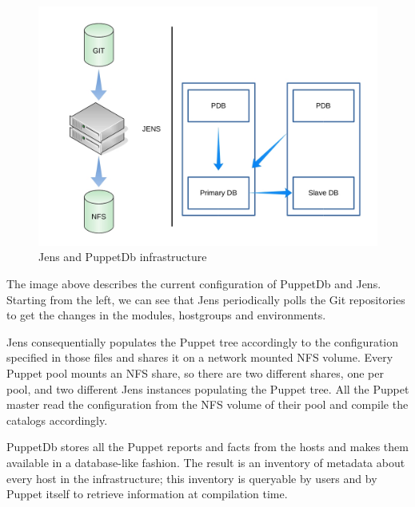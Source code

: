 \begin{figure}[H]
\includegraphics[width=\textwidth,height=\textheight,keepaspectratio]{ConfigurationManagement/Infrastructure_jens_pdb.jpg}
\caption{Jens and PuppetDb infrastructure}
\end{figure}

The image above describes the current configuration of PuppetDb and Jens.
Starting from the left, we can see that Jens periodically polls the Git
repositories to get the changes in the modules, hostgroups and
environments.

Jens consequentially populates the Puppet tree accordingly to the
configuration specified in those files and shares it on a network mounted
NFS volume. Every Puppet pool mounts an NFS share, so there are two
different shares, one per pool, and two different Jens instances
populating the Puppet tree. All the Puppet master read the configuration
from the NFS volume of their pool and compile the catalogs accordingly.

PuppetDb stores all the Puppet reports and facts from the hosts and makes
them available in a database-like fashion. The result is an inventory of
metadata about every host in the infrastructure; this inventory is
queryable by users and by Puppet itself to retrieve information at
compilation time.
